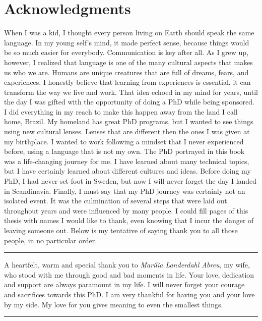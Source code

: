 \chapter*{Acknowledgments}

When I was a kid, I thought every person living on Earth should speak the same language. In my young self's mind, it made perfect sense, because things would be so much easier for everybody. Communication is key after all. As I grew up, however, I realized that language is one of the many cultural aspects that makes us who we are. Humans are unique creatures that are full of dreams, fears, and experiences. I honestly believe that learning from experiences is essential, it can transform the way we live and work. That idea echoed in my mind for years, until the day I was gifted with the opportunity of doing a PhD while being sponsored. I did everything in my reach to make this happen away from the land I call home, Brazil. My homeland has great PhD programs, but I wanted to see things using new cultural lenses. Lenses that are different then the ones I was given at my birthplace. I wanted to work following a mindset that I never experienced before, using a language that is not my own. The PhD portrayed in this book was a life-changing journey for me. I have learned about many technical topics, but I have certainly learned about different cultures and ideas. Before doing my PhD, I had never set foot in Sweden, but now I will never forget the day I landed in Scandinavia. Finally, I must say that my PhD journey was certainly not an isolated event. It was the culmination of several steps that were laid out throughout years and were influenced by many people. I could fill pages of this thesis with names I would like to thank, even knowing that I incur the danger of leaving someone out. Below is my tentative of saying thank you to all those people, in no particular order.

\vspace{7pt}\hrule\vspace{5pt}

A heartfelt, warm and special thank you to \textit{Marilia Landerdahl Abreu}, my wife, who stood with me through good and bad moments in life. Your love, dedication and support are always paramount in my life. I will never forget your courage and sacrifices towards this PhD. I am very thankful for having you and your love by my side. My love for you gives meaning to even the smallest things.

\vspace{7pt}\hrule\vspace{5pt}

